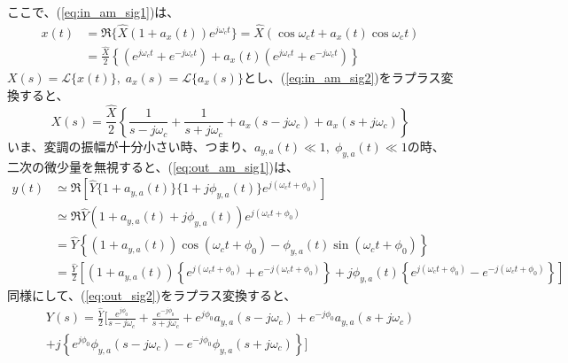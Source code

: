 \documentclass[book]{jlreq}
\begin{document}
ここで、(\ref{eq:in_am_sig1})は、
%
\begin{equation}
    \begin{split}
        x(t) &= \Re\{\hat{X}(1 + a_x(t))e^{j\omega_c t}\} 
            = \hat{X}(\cos\omega_c t + a_x(t) \cos\omega_c t) \\
            &=  \frac{\hat{X}}{2}\left \{(e^{j\omega_c t}+e^{-j\omega_c t})+a_x(t)(e^{j\omega_c t} + e^{-j\omega_c t}) \right \}
            \label{eq:in_am_sig2}
    \end{split}
\end{equation}
%
$X(s)=\mathcal{L}\{x(t)\},\; a_x(s) = \mathcal{L}\{a_x(s)\}$とし、(\ref{eq:in_am_sig2})をラプラス変換すると、
%
\begin{equation}
    X(s) = \frac{\hat{X}}{2}\left \{\frac{1}{s-j\omega_c}+\frac{1}{s+j\omega_c} + a_x(s - j\omega_c)+a_x(s+j\omega_c) \right \}
    \label{eq:lt_in_sig2}
\end{equation}
%
いま、変調の振幅が十分小さい時、つまり、$a_{y, a}(t) \ll 1,\; \phi_{y, a}(t) \ll 1$の時、二次の微少量を無視すると、(\ref{eq:out_am_sig1})は、
%
\begin{equation}
    \begin{split}
        y(t) &\simeq \Re\left [\hat{Y}\{1 + a_{y, a}(t)\}\{1 + j \phi_{y, a} (t)\}e^{j(\omega_c t +  \phi_0)}\right ] \\ 
        &\simeq\Re{\hat{Y}(1 + a_{y, a}(t)+ j \phi_{y, a} (t))e^{j(\omega_c t +  \phi_0)}} \\ 
        &= \hat{Y}\left \{(1+ a_{y,a}(t))\cos(\omega_c t +  \phi_0) 
        - \phi_{y, a}(t)\sin(\omega_c t +  \phi_0) \right \} \\
        &= \frac{\hat{Y}}{2}\left [\left (1+a_{y,a}(t)\right )\left \{e^{j(\omega_c t 
        + \phi_0)}+e^{-j(\omega_c t+\phi_0)}\right \}
        +j \phi_{y,a}(t)\left \{e^{j(\omega_c t+\phi_0)}-e^{-j(\omega_c t + \phi_0)}\right \} \right ]
        \label{eq:out_sig2}
    \end{split}
\end{equation}
%
同様にして、(\ref{eq:out_sig2})をラプラス変換すると、
%
\begin{multline}
    Y(s) = \frac{\hat{Y}}{2}\biggr [\frac{e^{j\phi_0}}{s-j\omega_c}+\frac{e^{-j\phi_0}}{s+j\omega_c} 
    + e^{j\phi_0}a_{y, a}(s - j\omega_c) + e^{-j\phi_0}a_{y, a}(s+j\omega_c) \\
    + j\left \{e^{j\phi_0}\phi_{y,a}(s-j\omega_c) - e^{-j\phi_0}\phi_{y,a}(s+j\omega_c) \right \} \biggl ]
    \label{eq:lt_out_sig2}
\end{multline}
\end{document}
